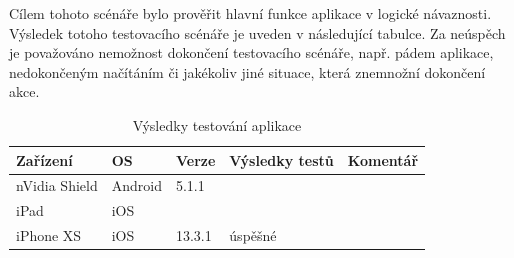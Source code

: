 Cílem tohoto scénáře bylo prověřit hlavní funkce aplikace v logické návaznosti. Výsledek totoho testovacího scénáře je uveden v následující tabulce. Za neúspěch je považováno nemožnost dokončení testovacího scénáře, např. pádem aplikace, nedokončeným načítáním či jakékoliv jiné situace, která znemnožní dokončení akce.

\begin{table}[H]
	\begin{tabularx}{\textwidth}{|X|X|X|X|X|}
		\hline
		Zařízení        & OS      & Verze  & Výsledky testů & Komentář \\ \hline
		nVidia Shield   & Android & 5.1.1  &                &          \\ \hline
		iPad            & iOS     &        &                &          \\ \hline
		iPhone XS       & iOS     & 13.3.1 &  úspěšné              &          \\ \hline
	\end{tabularx}
	\caption{Výsledky testování aplikace}
\end{table}